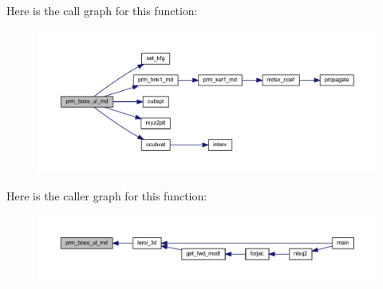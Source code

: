 Here is the call graph for this function\+:\nopagebreak
\begin{figure}[H]
\begin{center}
\leavevmode
\includegraphics[width=350pt]{Leroi_8f90_ab6689c64fba851d3db437dbd7fc0d13a_cgraph}
\end{center}
\end{figure}
Here is the caller graph for this function\+:\nopagebreak
\begin{figure}[H]
\begin{center}
\leavevmode
\includegraphics[width=350pt]{Leroi_8f90_ab6689c64fba851d3db437dbd7fc0d13a_icgraph}
\end{center}
\end{figure}
\mbox{\label{Leroi_8f90_a5285d5a2942c499f6219805b1e689588}} 

